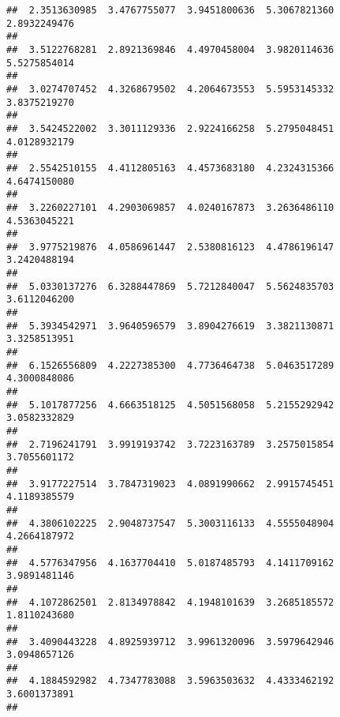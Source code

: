 \documentclass[]{article}
\begin{document}
\begin{verbatim}
##  2.3513630985  3.4767755077  3.9451800636  5.3067821360  2.8932249476 
##                                                                       
##  3.5122768281  2.8921369846  4.4970458004  3.9820114636  5.5275854014 
##                                                                       
##  3.0274707452  4.3268679502  4.2064673553  5.5953145332  3.8375219270 
##                                                                       
##  3.5424522002  3.3011129336  2.9224166258  5.2795048451  4.0128932179 
##                                                                       
##  2.5542510155  4.4112805163  4.4573683180  4.2324315366  4.6474150080 
##                                                                       
##  3.2260227101  4.2903069857  4.0240167873  3.2636486110  4.5363045221 
##                                                                       
##  3.9775219876  4.0586961447  2.5380816123  4.4786196147  3.2420488194 
##                                                                       
##  5.0330137276  6.3288447869  5.7212840047  5.5624835703  3.6112046200 
##                                                                       
##  5.3934542971  3.9640596579  3.8904276619  3.3821130871  3.3258513951 
##                                                                       
##  6.1526556809  4.2227385300  4.7736464738  5.0463517289  4.3000848086 
##                                                                       
##  5.1017877256  4.6663518125  4.5051568058  5.2155292942  3.0582332829 
##                                                                       
##  2.7196241791  3.9919193742  3.7223163789  3.2575015854  3.7055601172 
##                                                                       
##  3.9177227514  3.7847319023  4.0891990662  2.9915745451  4.1189385579 
##                                                                       
##  4.3806102225  2.9048737547  5.3003116133  4.5555048904  4.2664187972 
##                                                                       
##  4.5776347956  4.1637704410  5.0187485793  4.1411709162  3.9891481146 
##                                                                       
##  4.1072862501  2.8134978842  4.1948101639  3.2685185572  1.8110243680 
##                                                                       
##  3.4090443228  4.8925939712  3.9961320096  3.5979642946  3.0948657126 
##                                                                       
##  4.1884592982  4.7347783088  3.5963503632  4.4333462192  3.6001373891 
##                                                                       

\end{verbatim}
\end{document}
